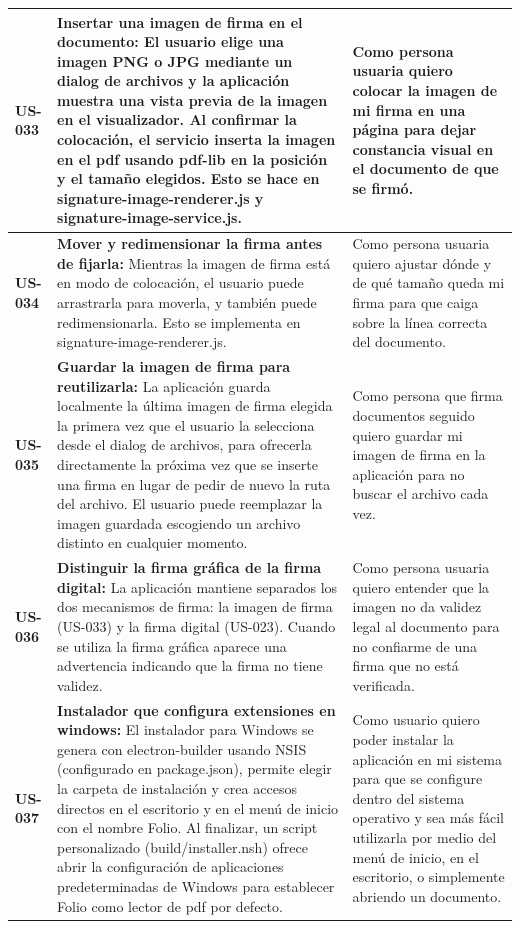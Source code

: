 \begin{longtable}{|l||p{7cm}|p{4.5cm}|}
\hline
\textbf{US-033} & \textbf{Insertar una imagen de firma en el documento:} El usuario elige una imagen PNG o JPG mediante un dialog de archivos y la aplicación muestra una vista previa de la imagen en el visualizador. Al confirmar la colocación, el servicio inserta la imagen en el pdf usando pdf-lib en la posición y el tamaño elegidos. Esto se hace en signature-image-renderer.js y signature-image-service.js. & Como persona usuaria quiero colocar la imagen de mi firma en una página para dejar constancia visual en el documento de que se firmó.\\
\hline
\textbf{US-034} & \textbf{Mover y redimensionar la firma antes de fijarla:} Mientras la imagen de firma está en modo de colocación, el usuario puede arrastrarla para moverla, y también puede redimensionarla. Esto se implementa en signature-image-renderer.js. & Como persona usuaria quiero ajustar dónde y de qué tamaño queda mi firma para que caiga sobre la línea correcta del documento.\\
\hline
\textbf{US-035} & \textbf{Guardar la imagen de firma para reutilizarla:} La aplicación guarda localmente la última imagen de firma elegida la primera vez que el usuario la selecciona desde el dialog de archivos, para ofrecerla directamente la próxima vez que se inserte una firma en lugar de pedir de nuevo la ruta del archivo. El usuario puede reemplazar la imagen guardada escogiendo un archivo distinto en cualquier momento. & Como persona que firma documentos seguido quiero guardar mi imagen de firma en la aplicación para no buscar el archivo cada vez.\\
\hline
\textbf{US-036} & \textbf{Distinguir la firma gráfica de la firma digital:} La aplicación mantiene separados los dos mecanismos de firma: la imagen de firma (US-033) y la firma digital (US-023). Cuando se utiliza la firma gráfica aparece una advertencia indicando que la firma no tiene validez. & Como persona usuaria quiero entender que la imagen no da validez legal al documento para no confiarme de una firma que no está verificada.\\
\hline
\textbf{US-037} & \textbf{Instalador que configura extensiones en windows:} El instalador para Windows se genera con electron-builder usando NSIS (configurado en package.json), permite elegir la carpeta de instalación y crea accesos directos en el escritorio y en el menú de inicio con el nombre Folio. Al finalizar, un script personalizado (build/installer.nsh) ofrece abrir la configuración de aplicaciones predeterminadas de Windows para establecer Folio como lector de pdf por defecto. & Como usuario quiero poder instalar la aplicación en mi sistema para que se configure dentro del sistema operativo y sea más fácil utilizarla por medio del menú de inicio, en el escritorio, o simplemente abriendo un documento.\\

\end{longtable}
